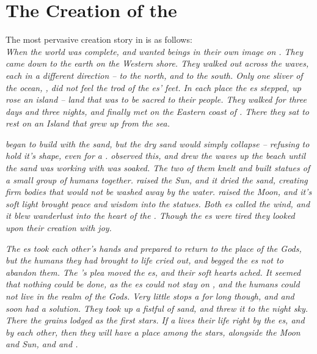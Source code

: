 \documentclass[blue]{GL2020}
\begin{document}
\section*{The Creation of the \pShippies{}}
The most pervasive creation story in \pShip{} is as follows:\\
\emph{When the world was complete, \cEbb{} and \cFlow{} wanted beings in their own image on \pEarth{}. They came down to the earth on the Western shore. They walked out across the waves, each in a different direction -- \cEbb{} to the north, and \cFlow{} to the south. Only one sliver of the ocean, \pWod{}, did not feel the trod of the \cEbb{\God}es' feet. In each place the \cEbb{\God}es stepped, up rose an island -- land that was to be sacred to their people. They walked for three days and three nights, and finally met on the Eastern coast of \pEarth{}. There they sat to rest on an Island that grew up from the sea.}

\emph{\cFlow{} began to build with the sand, but the dry sand would simply collapse -- refusing to hold it's shape, even for a \cFlow{\God}. \cEbb{} observed this, and drew the waves up the beach until the sand \cFlow{} was working with was soaked. The two of them knelt and built statues of a small group of humans together. \cFlow{} raised the Sun, and it dried the sand, creating firm bodies that would not be washed away by the water. \cEbb{} raised the Moon, and it's soft light brought peace and wisdom into the statues. Both \cEbb{\God}es called the wind, and it blew wanderlust into the heart of the \pShippies{}. Though the \cEbb{\God}es were tired they looked upon their creation with joy.}

\emph{The \cEbb{\God}es took each other's hands and prepared to return to the place of the Gods, but the humans they had brought to life cried out, and begged the \cEbb{\God}es not to abandon them. The \pShippies{}'s plea moved the \cEbb{\God}es, and their soft hearts ached. It seemed that nothing could be done, as the \cEbb{\God}es could not stay on \pEarth{}, and the humans could not live in the realm of the Gods. Very little stops a \cEbb{\God} for long though, and \cEbb{} and \cFlow{} soon had a solution. They took up a fistful of sand, and threw it to the night sky. There the grains lodged as the first stars. If a \pShippies{} lives their life right by the \cEbb{\God}es, and by each other, then they will have a place among the stars, alongside the Moon and Sun, and \cEbb{} and \cFlow{}.}
\end{document}
